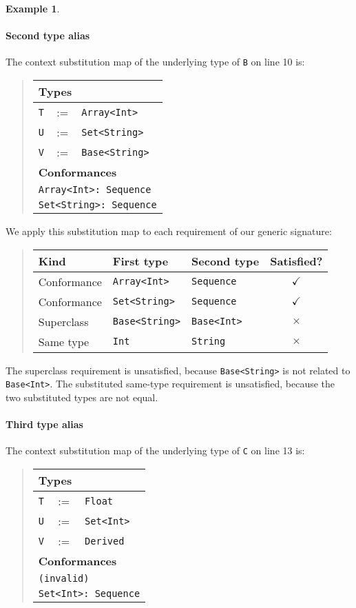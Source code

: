 \documentclass[a4paper,headsepline,bibliography=totoc,toc=flat,fleqn,twoside=semi]{scrbook}
\theoremstyle{definition}
\theoremstyle{definition}
\newtheorem{example}{Example}[chapter]
\theoremstyle{definition}
\newcommand{\SubMapC}[2]{\begin{tabular}{|lll|}
\hline
\multicolumn{3}{|l|}{\textbf{Types}}\\
\hline
#1\\
\hline
\hline
\multicolumn{3}{|l|}{\textbf{Conformances}}\\
\hline
#2\\
\hline
\end{tabular}}
\newcommand{\SubConf}[1]{\multicolumn{3}{|l|}{\texttt{#1}}}
\begin{document}
\begin{example}
\paragraph{Second type alias} The context substitution map of the underlying type of \texttt{B} on line 10 is:
\begin{quote}
\SubMapC{
\texttt{T}&:=&\texttt{Array<Int>}\\
\texttt{U}&:=&\texttt{Set<String>}\\
\texttt{V}&:=&\texttt{Base<String>}
}{
\SubConf{Array<Int>:\ Sequence}\\
\SubConf{Set<String>:\ Sequence}
}
\end{quote}

We apply this substitution map to each requirement of our generic signature:
\begin{quote}
\begin{tabular}{|l|l|l|c|}
\hline
Kind&First type&Second type&Satisfied?\\
\hline
Conformance&\texttt{Array<Int>}&\texttt{Sequence}&$\checkmark$\\
Conformance&\texttt{Set<String>}&\texttt{Sequence}&$\checkmark$\\
Superclass&\texttt{Base<String>}&\texttt{Base<Int>}&$\times$\\
Same type&\texttt{Int}&\texttt{String}&$\times$\\
\hline
\end{tabular}
\end{quote}
The superclass requirement is unsatisfied, because \texttt{Base<String>} is not related to \texttt{Base<Int>}. The substituted same-type requirement is unsatisfied, because the two substituted types are not equal.

\paragraph{Third type alias} The context substitution map of the underlying type of \texttt{C} on line 13 is:
\begin{quote}
\SubMapC{
\texttt{T}&:=&\texttt{Float}\\
\texttt{U}&:=&\texttt{Set<Int>}\\
\texttt{V}&:=&\texttt{Derived}
}{
\SubConf{(invalid)}\\
\SubConf{Set<Int>:\ Sequence}
}
\end{quote}


\end{example}
\end{document}
